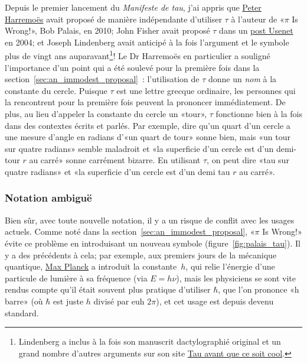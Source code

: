Depuis le premier lancement du \emph{Manifeste de tau}, j'ai appris que
\href{http://www.harremoes.dk/Peter/Undervis/Turnpage/Turnpage1.pdf}{Peter
Harremoës} avait proposé de manière indépendante d'utiliser $\tau$ à l'auteur de
«\ns $\pi$ Is Wrong!\ns », Bob Palais, en 2010\ns; John Fisher avait proposé $\tau$ dans
un
\href{https://groups.google.com/forum/#!msg/sci.math/c-DHmJHSA0A/sLCoOtHB1UAJ}{post
Usenet} en 2004\ns; et Joseph Lindenberg avait anticipé à la fois l'argument et le
symbole plus de vingt ans auparavant\ns\footnote{Lindenberg a inclus à la fois
son manuscrit dactylographié original et un grand nombre d'autres arguments sur
son site
\href{https://translate.google.com/translate?hl=en&sl=en&tl=fr&u=https://sites.google.com/site/taubeforeitwascool/}{Tau
avant que ce soit cool}.}\ns! Le Dr Harremoës en
particulier a souligné l'importance d'un point qui a été soulevé pour la
première fois dans la section~\ref{sec:an_immodest_proposal}~: l'utilisation de
$\tau$ donne un \emph{nom} à la constante du cercle. Puisque $\tau$ est une
lettre grecque ordinaire, les personnes qui la rencontrent pour la première fois
peuvent la prononcer immédiatement. De plus, au lieu d'appeler la
constante du cercle un «\ns tour\ns », $\tau$ fonctionne bien à la fois dans des
contextes écrits et parlés. Par exemple, dire qu'un quart d'un cercle a une
mesure d'angle en radians d'«\ns un quart de tour\ns » sonne bien, mais «\ns un tour sur quatre
radians\ns » semble maladroit et «\ns la superficie d'un cercle est d'un demi-tour $r$
au carré\ns » sonne carrément bizarre. En utilisant $\tau$, on peut dire «\ns tau
sur quatre radians\ns » et «\ns la superficie d'un cercle est d'un demi tau $r$ au
carré\ns ».

    \subsubsection{Notation ambiguë} %
    \label{sec:ambiguous_notation}


Bien sûr, avec toute nouvelle notation, il y a un risque de conflit avec
les usages actuels. Comme noté dans la
section~\ref{sec:an_immodest_proposal}, «\ns $\pi$ Is Wrong!\ns » évite ce problème
en introduisant un nouveau symbole (figure~\ref{fig:palais_tau}). Il y a des
précédents à cela\ns; par exemple, aux premiers jours de la mécanique quantique,
\href{https://fr.wikipedia.org/wiki/Max_Planck}{Max Planck} a introduit la
constante~$h$, qui relie l'énergie d'une particule de lumière à sa fréquence (via
$E = h\nu$), mais les physiciens se sont vite rendus compte qu'il était souvent
plus pratique d'utiliser $\hbar$, que l'on prononce «\ns h barre\ns » (où $\hbar$
est juste $h$ divisé par\textellipsis{} euh\textellipsis{} $2\pi$), et cet usage
est depuis devenu standard.

